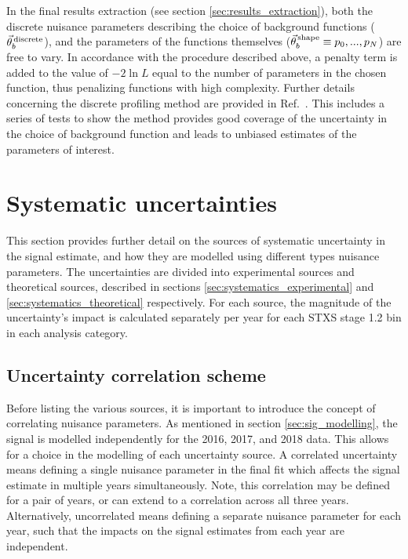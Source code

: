 In the final results extraction (see section \ref{sec:results_extraction}), both the discrete nuisance parameters describing the choice of background functions ($\vec{\theta}^{\,\rm{discrete}}_{b}$), and the parameters of the functions themselves ($\vec{\theta}^{\,\rm{shape}}_{b} \equiv p_0,...,p_N$) are free to vary. In accordance with the procedure described above, a penalty term is added to the value of $-2\ln{L}$ equal to the number of parameters in the chosen function, thus penalizing functions with high complexity. Further details concerning the discrete profiling method are provided in Ref.~\cite{Dauncey:2014xga}. This includes a series of tests to show the method provides good coverage of the uncertainty in the choice of background function and leads to unbiased estimates of the parameters of interest.

\section{Systematic uncertainties}\label{sec:systematics}
This section provides further detail on the sources of systematic uncertainty in the signal estimate, and how they are modelled using different types nuisance parameters. The uncertainties are divided into experimental sources and theoretical sources, described in sections \ref{sec:systematics_experimental} and \ref{sec:systematics_theoretical} respectively. For each source, the magnitude of the uncertainty's impact is calculated separately per year for each STXS stage 1.2 bin in each analysis category.

\subsection{Uncertainty correlation scheme}
Before listing the various sources, it is important to introduce the concept of correlating nuisance parameters. As mentioned in section \ref{sec:sig_modelling}, the signal is modelled independently for the 2016, 2017, and 2018 data. This allows for a choice in the modelling of each uncertainty source. A correlated uncertainty means defining a single nuisance parameter in the final fit which affects the signal estimate in multiple years simultaneously. Note, this correlation may be defined for a pair of years, or can extend to a correlation across all three years. Alternatively, uncorrelated means defining a separate nuisance parameter for each year, such that the impacts on the signal estimates from each year are independent. 

